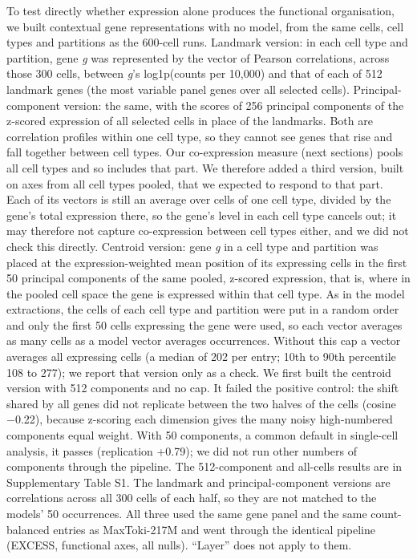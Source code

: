 \documentclass[
  11pt,
]{article}
\begin{document}
To test directly whether expression alone produces the functional
organisation, we built contextual gene representations with no model,
from the same cells, cell types and partitions as the 600-cell runs.
Landmark version: in each cell type and partition, gene \emph{g} was
represented by the vector of Pearson correlations, across those 300
cells, between \emph{g}'s log1p(counts per 10,000) and that of each of
512 landmark genes (the most variable panel genes over all selected
cells). Principal-component version: the same, with the scores of 256
principal components of the z-scored expression of all selected cells in
place of the landmarks. Both are correlation profiles within one cell
type, so they cannot see genes that rise and fall together between cell
types. Our co-expression measure (next sections) pools all cell types
and so includes that part. We therefore added a third version, built on
axes from all cell types pooled, that we expected to respond to that
part. Each of its vectors is still an average over cells of one cell
type, divided by the gene's total expression there, so the gene's level
in each cell type cancels out; it may therefore not capture
co-expression between cell types either, and we did not check this
directly. Centroid version: gene \emph{g} in a cell type and partition
was placed at the expression-weighted mean position of its expressing
cells in the first 50 principal components of the same pooled, z-scored
expression, that is, where in the pooled cell space the gene is
expressed within that cell type. As in the model extractions, the cells
of each cell type and partition were put in a random order and only the
first 50 cells expressing the gene were used, so each vector averages as
many cells as a model vector averages occurrences. Without this cap a
vector averages all expressing cells (a median of 202 per entry; 10th to
90th percentile 108 to 277); we report that version only as a check. We
first built the centroid version with 512 components and no cap. It
failed the positive control: the shift shared by all genes did not
replicate between the two halves of the cells (cosine −0.22), because
z-scoring each dimension gives the many noisy high-numbered components
equal weight. With 50 components, a common default in single-cell
analysis, it passes (replication +0.79); we did not run other numbers of
components through the pipeline. The 512-component and all-cells results
are in Supplementary Table S1. The landmark and principal-component
versions are correlations across all 300 cells of each half, so they are
not matched to the models' 50 occurrences. All three used the same gene
panel and the same count-balanced entries as MaxToki-217M and went
through the identical pipeline (EXCESS, functional axes, all nulls).
``Layer'' does not apply to them.
\end{document}
